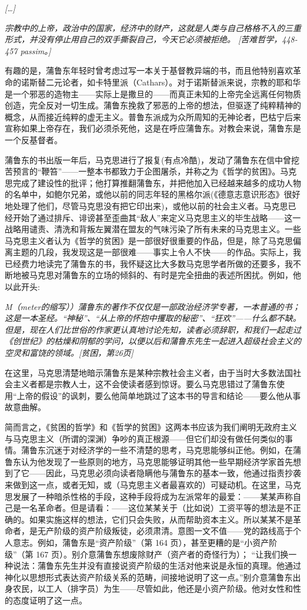 \documentclass[DIV=12,%
               BCOR=0mm,%
               headinclude=false,%
               footinclude=false,open=any,%
               fontsize=10pt,%
               oneside,%
               paper=210mm:11in]%
               {scrbook}
\begin{document}
\emph{[\dots{}]}


\emph{宗教中的上帝，政治中的国家，经济中的财产，这就是人类与自己格格不入的三重形式，并没有停止用自己的双手撕裂自己，今天它必须被拒绝。 [苦难哲学，448-457 passim。]}


有趣的是，蒲鲁东年轻时曾考虑过写一本关于基督教异端的书，而且他特别喜欢革命的诺斯替二元论者，如卡特里派（Cathars）。对于诺斯替派来说，宗教的耶和华是一个邪恶的造物主——实际上是撒旦的——而真正未知的上帝完全远离任何物质创造，完全反对一切生成。蒲鲁东挽救了邪恶的上帝的想法，但驱逐了纯粹精神的概念，从而接近纯粹的虚无主义。普鲁东派成为众所周知的无神论者，巴枯宁后来宣称如果上帝存在，我们必须杀死他，这是在呼应蒲鲁东。对教会来说，蒲鲁东是一个反基督者。


蒲鲁东的书出版一年后，马克思进行了报复(有点冷酷)，发动了蒲鲁东在信中曾挖苦预言的“鞭笞”——一整本书都致力于企图屠杀，并称之为《哲学的贫困》。马克思完成了建设性的批评；他打算推翻蒲鲁东，并把他加入已经越来越多的成功人物的名单中，如鲍尔兄弟，或他以前的同志年轻的黑格尔派(《德意志意识形态》很好地处理了他们，尽管马克思没有把它印出来)，或他以前的社会主义者。马克思已经开始了通过排斥、诽谤甚至歪曲其“敌人”来定义马克思主义的毕生战略——这一战略用谴责、清洗和背叛左翼潜在盟友的气味污染了所有未来的马克思主义。一些马克思主义者认为《哲学的贫困》是一部很好很重要的作品，但是，除了马克思偏离主题的几段，我发现这是一部很难——事实上令人不快——的作品。实际上，我已经费力地读完了蒲鲁东的书，我怀疑这比大多数马克思学者所做的还要多，我不断地被马克思对蒲鲁东的立场的倾斜的、有时是完全扭曲的表述所困扰。例如，他以此开头:


\emph{M（meter的缩写））蒲鲁东的著作不仅仅是一部政治经济学专著，一本普通的书；这是一本圣经。“神秘”、“从上帝的怀抱中攫取的秘密”、“狂欢”——什么都不缺。但是，现在人们比世俗的作家更认真地讨论先知，读者必须辞职，和我们一起走过《创世纪》的枯燥和阴郁的学问，以便以后和蒲鲁东先生一起进入超级社会主义的空灵和富饶的领域。[贫困，第26页]}


在这里，马克思清楚地暗示蒲鲁东是某种宗教社会主义者，由于当时大多数法国社会主义者都是宗教人士，这不会使读者感到惊讶。要么马克思错过了蒲鲁东使用“上帝的假设”的讽刺，要么他简单地跳过了这本书的导言和结论——要么他从事故意曲解。


简而言之，《贫困的哲学》和《哲学的贫困》这两本书应该为我们阐明无政府主义与马克思主义（所谓的深渊）争吵的真正根源——但它们却没有做任何类似的事情。蒲鲁东沉迷于对经济学的一些不清楚的思考，马克思能够纠正他。例如，在蒲鲁东认为他发现了一些原则的地方，马克思能够证明其他一些早期经济学家首先想到了它——因此，马克思必须向读者隐瞒他与蒲鲁东的基本一致，他通过指责抄袭来做到这一点，或者无知，或（马克思主义者最喜欢的）可疑动机。在这里，马克思发展了一种暗杀性格的手段，这种手段将成为左派常年的最爱：——某某声称自己是一名革命者。但是请看：——这位某某关于（比如说）工资平等的想法是不正确的。如果实施这样的想法，它们只会失败，从而帮助资本主义。所以某某不是革命者，是无产阶级的资产阶级叛徒，必须肃清。意图一文不值——党的路线高于个人意志。例如，蒲鲁东是“资产阶级”（第 164 页），甚至更糟的是“小资产阶级”（第 167 页）。别介意蒲鲁东想废除财产（资产者的奇怪行为）； “让我们换一种说法：蒲鲁东先生并没有直接说资产阶级的生活对他来说是永恒的真理。他通过神化以思想形式表达资产阶级关系的范畴，间接地说明了这一点。”别介意蒲鲁东出身农民，以工人（排字员）为生——尽管如此，他还是小资产阶级。他对女性和性的态度证明了这一点。
\end{document}
